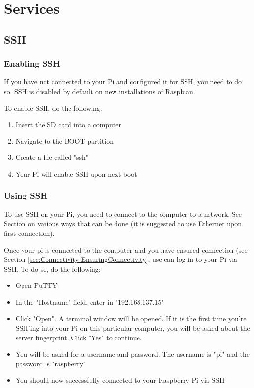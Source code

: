 \section{Services}
\subsection{SSH}
\label{sec:SSH}
\subsubsection{Enabling SSH}
If you have not connected to your Pi and configured it for SSH, you need to do so. SSH is disabled by default on new installations of Raspbian.

To enable SSH, do the following:
\begin{enumerate}
    \item Insert the SD card into a computer 
    \item Navigate to the BOOT partition
    \item Create a file called "ssh" 
    \item Your Pi will enable SSH upon next boot
\end{enumerate}

\subsubsection{Using SSH}
To use SSH on your Pi, you need to connect to the computer to a network. See Section \label{sec:Connectivity} on various ways that can be done (it is suggested to use Ethernet upon first connection).

Once your pi is connected to the computer and you have ensured connection (see Section \ref{sec:Connectivity-EnsuringConnectivity}, use can log in to your Pi via SSH. To do so, do the following:

\begin{itemize}
    \item Open PuTTY
    \item In the "Hostname" field, enter in "192.168.137.15"
    \item Click "Open". A terminal window will be opened. If it is the first time you're SSH'ing into your Pi on this particular computer, you will be asked about the server fingerprint. Click "Yes" to continue.
    \item You will be asked for a username and password. The username is "pi" and the password is "raspberry"
    \item You should now successfully connected to your Raspberry Pi via SSH
\end{itemize}

